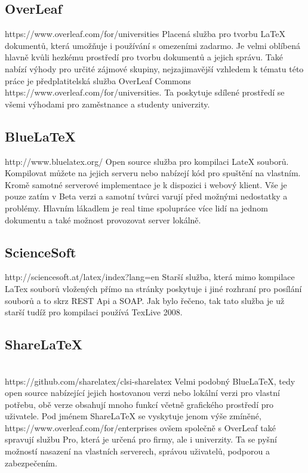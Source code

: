 \subsection{OverLeaf}
https://www.overleaf.com/for/universities
Placená služba pro tvorbu LaTeX dokumentů, která umožňuje i používání s omezeními zadarmo. Je velmi oblíbená hlavně kvůli hezkému prostředí pro tvorbu dokumentů a jejich správu. Také nabízí výhody pro určité zájmové skupiny, nejzajimavější vzhledem k tématu této práce je předplatitelská služba OverLeaf Commons https://www.overleaf.com/for/universities. Ta poskytuje sdílené prostředí se všemi výhodami pro zaměstnance a studenty univerzity.

\subsection{BlueLaTeX}
http://www.bluelatex.org/
Open source služba pro kompilaci LateX souborů. Kompilovat můžete na jejich serveru nebo nabízejí kód pro spuštění na vlastním. Kromě samotné serverové implementace je k dispozici i webový klient. Vše je pouze zatím v Beta verzi a samotní tvůrci varují před možnými nedostatky a problémy. Hlavním lákadlem je real time spolupráce více lidí na jednom dokumentu a také možnost provozovat server lokálně. 

\subsection{ScienceSoft}
http://sciencesoft.at/latex/index?lang=en
Starší služba, která mimo kompilace LaTex souborů vložených přímo na stránky poskytuje i jiné rozhraní pro posílání souborů a to skrz REST Api a SOAP. Jak bylo řečeno, tak tato služba je už starší tudíž pro kompilaci používá TexLive 2008.

\subsection{ShareLaTeX}\\
https://github.com/sharelatex/clsi-sharelatex
Velmi podobný BlueLaTeX, tedy open source nabízející jejich hostovanou verzi nebo lokální verzi pro vlastní potřebu, obě verze obsahují mnoho funkcí včetně grafického prostředí pro uživatele. Pod jménem ShareLaTeX se vyskytuje jenom výše zmíněné, https://www.overleaf.com/for/enterprises ovšem společně s OverLeaf také spravují službu Pro, která je určená pro firmy, ale i univerzity. Ta se pyšní možností nasazení na vlastních serverech, správou uživatelů, podporou a zabezpečením.

